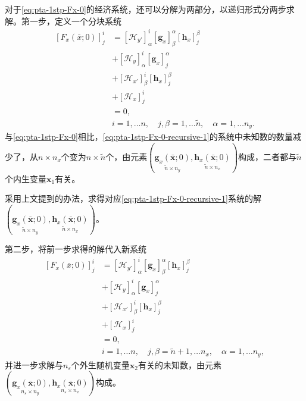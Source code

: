 \begin{remark}[二次系统的递归分解]
  对于\eqref{eq:pta-1stp-Fx-0}的经济系统，还可以分解为两部分，以递归形式分两步求解。第一步，定义一个分块系统
  \begin{equation}
    \label{eq:pta-1stp-Fx-0-recursive-1}
    \begin{split}
      \left[F_x(\bar{x};0)\right]^{i}_{j} &=
      \left[ \mathcal{H}_{y'} \right]^{i}_{\alpha}
      \left[ \bm{g}_x \right]^{\alpha}_{\beta}
      \left[ \bm{h}_x \right]^{\beta}_{j} \\
      &+
      \left[ \mathcal{H}_{y} \right]^{i}_{\alpha}
      \left[ \bm{g}_x \right]^{\alpha}_{j}\\
      &+
      \left[ \mathcal{H}_{x'} \right]^{i}_{\beta}
      \left[ \bm{h}_{x} \right]^{\beta}_{j} \\
      &+
      \left[ \mathcal{H}_{x} \right]^{i}_{j}\\
      &=0, \\
      &i=1,\ldots n, \quad j, \beta = 1, \ldots \tilde{n}, \quad \alpha = 1, \ldots n_y.
    \end{split}
  \end{equation}
与\eqref{eq:pta-1stp-Fx-0}相比，\eqref{eq:pta-1stp-Fx-0-recursive-1}的系统中未知数的数量减少了，从$n \times n_x$个变为$n \times \tilde{n}$个，由元素$\left(
\underset{\tilde{n} \times n_y}{\bm{g}_{x}(\bar{\bm{x}};0)},
\underset{\tilde{n} \times n_x}{\bm{h}_{x}(\bar{\bm{x}};0)}
\right)$构成，二者都与$\tilde{n}$个内生变量$\bm{x}_1$有关。

采用上文提到的办法，求得对应\eqref{eq:pta-1stp-Fx-0-recursive-1}系统的解$\left(
\underset{\tilde{n} \times n_y}{\bm{g}_{x}(\bar{\bm{x}};0)},
\underset{\tilde{n} \times n_x}{\bm{h}_{x}(\bar{\bm{x}};0)}
\right)$。

第二步，将前一步求得的解代入新系统
\begin{equation}
  \label{eq:pta-1stp-Fx-0-recursive-2}
  \begin{split}
    \left[F_x(\bar{x};0)\right]^{i}_{j} &=
    \left[ \mathcal{H}_{y'} \right]^{i}_{\alpha}
    \left[ \bm{g}_x \right]^{\alpha}_{\beta}
    \left[ \bm{h}_x \right]^{\beta}_{j} \\
    &+
    \left[ \mathcal{H}_{y} \right]^{i}_{\alpha}
    \left[ \bm{g}_x \right]^{\alpha}_{j}\\
    &+
    \left[ \mathcal{H}_{x'} \right]^{i}_{\beta}
    \left[ \bm{h}_{x} \right]^{\beta}_{j} \\
    &+
    \left[ \mathcal{H}_{x} \right]^{i}_{j}\\
    &=0, \\
    &i=1,\ldots n, \quad j, \beta = \tilde{n} + 1, \ldots n_x, \quad \alpha = 1, \ldots n_y,
  \end{split}
\end{equation}
并进一步求解与$n_{\varepsilon}$个外生随机变量$\bm{x}_{2}$有关的未知数，由元素$\left(
\underset{n_{\varepsilon} \times n_y}{\bm{g}_{x}(\bar{\bm{x}};0)},
\underset{n_{\varepsilon} \times n_x}{\bm{h}_{x}(\bar{\bm{x}};0)}
\right)$构成。
\end{remark}

